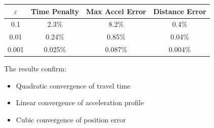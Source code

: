 \documentclass[12pt,a4paper]{article}
\begin{document}
\begin{center}
\begin{tabular}{|c|c|c|c|}
\hline
$\varepsilon$ & Time Penalty & Max Accel Error & Distance Error \\
\hline
0.1 & 2.3\% & 8.2\% & 0.4\% \\
0.01 & 0.24\% & 0.85\% & 0.04\% \\
0.001 & 0.025\% & 0.087\% & 0.004\% \\
\hline
\end{tabular}
\end{center}

The results confirm:
\begin{itemize}
\item Quadratic convergence of travel time
\item Linear convergence of acceleration profile
\item Cubic convergence of position error
\end{itemize}
\end{document}
